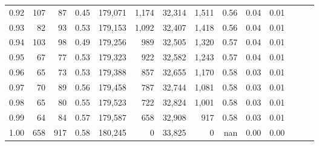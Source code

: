 \begin{tabular}{rrrrrrrrrrrrrr}
0.92 &    107 &   87 &  0.45 &  179,071 &    1,174 &  32,314 &   1,511 &  0.56 &  0.04 &      0.01 \\
0.93 &     82 &   93 &  0.53 &  179,153 &    1,092 &  32,407 &   1,418 &  0.56 &  0.04 &      0.01 \\
0.94 &    103 &   98 &  0.49 &  179,256 &      989 &  32,505 &   1,320 &  0.57 &  0.04 &      0.01 \\
0.95 &     67 &   77 &  0.53 &  179,323 &      922 &  32,582 &   1,243 &  0.57 &  0.04 &      0.01 \\
0.96 &     65 &   73 &  0.53 &  179,388 &      857 &  32,655 &   1,170 &  0.58 &  0.03 &      0.01 \\
0.97 &     70 &   89 &  0.56 &  179,458 &      787 &  32,744 &   1,081 &  0.58 &  0.03 &      0.01 \\
0.98 &     65 &   80 &  0.55 &  179,523 &      722 &  32,824 &   1,001 &  0.58 &  0.03 &      0.01 \\
0.99 &     64 &   84 &  0.57 &  179,587 &      658 &  32,908 &     917 &  0.58 &  0.03 &      0.01 \\
1.00 &    658 &  917 &  0.58 &  180,245 &        0 &  33,825 &       0 &   nan &  0.00 &      0.00 \\
\bottomrule
\end{tabular}
